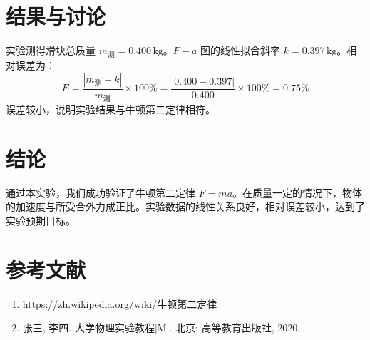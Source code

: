 \documentclass[12pt,a4paper]{article}
\begin{document}
\section{结果与讨论}
实验测得滑块总质量 $m_{\text{测}} = 0.400 \, \text{kg}$。$F-a$ 图的线性拟合斜率 $k = 0.397 \, \text{kg}$。相对误差为：
\begin{equation}
    E = \frac{|m_{\text{测}} - k|}{m_{\text{测}}} \times 100\% = \frac{|0.400 - 0.397|}{0.400} \times 100\% = 0.75\%
\end{equation}
误差较小，说明实验结果与牛顿第二定律相符。

\section{结论}
通过本实验，我们成功验证了牛顿第二定律 $F = ma$。在质量一定的情况下，物体的加速度与所受合外力成正比。实验数据的线性关系良好，相对误差较小，达到了实验预期目标。

\section{参考文献}
\begin{enumerate}
    \item \url{https://zh.wikipedia.org/wiki/牛顿第二定律}
    \item 张三, 李四. 大学物理实验教程[M]. 北京: 高等教育出版社, 2020.
\end{enumerate}
\end{document}
